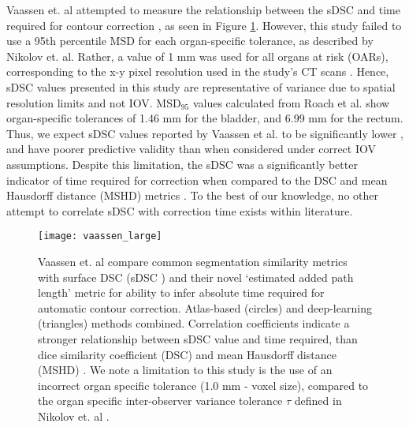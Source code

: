 Vaassen et. al attempted to measure the relationship between the sDSC and time required for contour correction \cite{vaassen2020}, as seen in Figure \ref{fig:vaassen}. However, this study failed to use a 95th percentile MSD for each organ-specific tolerance, as described by Nikolov et. al. Rather, a value of 1 mm was used for all organs at risk (OARs), corresponding to the x-y pixel resolution used in the study's CT scans \cite{vaassen2020}. Hence, sDSC values presented in this study are representative of variance due to spatial resolution limits and not IOV. MSD$_{95}$ values calculated from Roach et al. show organ-specific tolerances of 1.46 mm for the bladder, and 6.99 mm for the rectum. Thus, we expect sDSC values reported by Vaassen et al. to be significantly lower \cite{Nikolov_2018}, and have poorer predictive validity than when considered under correct IOV assumptions. Despite this limitation, the sDSC was a significantly better indicator of time required for correction when compared to the DSC and mean Hausdorff distance (MSHD) metrics \cite{vaassen2020}. To the best of our knowledge, no other attempt to correlate sDSC with correction time exists within literature.

\begin{figure}[H]
	\begin{center}
		\texttt{[image: vaassen\_large]}
		\caption{Vaassen et. al compare common segmentation similarity metrics with surface DSC (sDSC \cite{Nikolov_2018}) and their novel `estimated added path length' metric for ability to infer absolute time required for automatic contour correction. Atlas-based (circles) and deep-learning (triangles) methods combined. Correlation coefficients indicate a stronger relationship between sDSC value and time required, than dice similarity coefficient (DSC) and mean Hausdorff distance (MSHD) \cite{Vaassen_2020}. We note a limitation to this study is the use of an incorrect organ specific tolerance (1.0 mm - voxel size), compared to the organ specific inter-observer variance tolerance $\tau$ defined in Nikolov et. al \cite{Nikolov_2018}.}
		\label{fig:vaassen}
	\end{center}
\end{figure}




